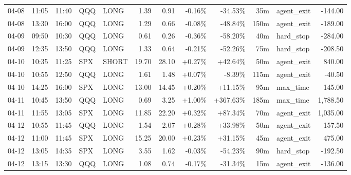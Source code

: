 \documentclass[11pt,a4paper,twoside]{article}
\begin{document}
\begin{center}
\begin{longtable}{>{\color{txtmain}}l l l l l r r r r r >{\color{txtmain}}l r}
04-08 & 11:05 & 11:40 & QQQ & LONG & 1.39 & 0.91 & \textcolor{lossred}{-0.16\%} & \textcolor{lossred}{-34.53\%} & 35m & agent\_exit & \textcolor{lossred}{-144.00} \\
04-08 & 13:30 & 16:00 & QQQ & LONG & 1.29 & 0.66 & \textcolor{lossred}{-0.08\%} & \textcolor{lossred}{-48.84\%} & 150m & agent\_exit & \textcolor{lossred}{-189.00} \\
04-09 & 09:50 & 10:30 & QQQ & LONG & 0.61 & 0.26 & \textcolor{lossred}{-0.36\%} & \textcolor{lossred}{-58.20\%} & 40m & hard\_stop & \textcolor{lossred}{-284.00} \\
04-09 & 12:35 & 13:50 & QQQ & LONG & 1.33 & 0.64 & \textcolor{lossred}{-0.21\%} & \textcolor{lossred}{-52.26\%} & 75m & hard\_stop & \textcolor{lossred}{-208.50} \\
04-10 & 10:35 & 11:25 & SPX & SHORT & 19.70 & 28.10 & \textcolor{wingreen}{+0.27\%} & \textcolor{wingreen}{+42.64\%} & 50m & agent\_exit & \textcolor{wingreen}{840.00} \\
04-10 & 10:55 & 12:50 & QQQ & LONG & 1.61 & 1.48 & \textcolor{wingreen}{+0.07\%} & \textcolor{lossred}{-8.39\%} & 115m & agent\_exit & \textcolor{lossred}{-40.50} \\
04-10 & 14:25 & 16:00 & SPX & LONG & 13.00 & 14.45 & \textcolor{wingreen}{+0.20\%} & \textcolor{wingreen}{+11.15\%} & 95m & max\_time & \textcolor{wingreen}{145.00} \\
04-11 & 10:45 & 13:50 & QQQ & LONG & 0.69 & 3.25 & \textcolor{wingreen}{+1.00\%} & \textcolor{wingreen}{+367.63\%} & 185m & max\_time & \textcolor{wingreen}{1,788.50} \\
04-11 & 11:55 & 13:05 & SPX & LONG & 11.85 & 22.20 & \textcolor{wingreen}{+0.32\%} & \textcolor{wingreen}{+87.34\%} & 70m & agent\_exit & \textcolor{wingreen}{1,035.00} \\
04-12 & 10:55 & 11:45 & QQQ & LONG & 1.54 & 2.07 & \textcolor{wingreen}{+0.28\%} & \textcolor{wingreen}{+33.98\%} & 50m & agent\_exit & \textcolor{wingreen}{157.50} \\
04-12 & 11:00 & 11:45 & SPX & LONG & 15.25 & 20.00 & \textcolor{wingreen}{+0.23\%} & \textcolor{wingreen}{+31.15\%} & 45m & agent\_exit & \textcolor{wingreen}{475.00} \\
04-12 & 13:05 & 14:35 & SPX & LONG & 3.55 & 1.62 & \textcolor{lossred}{-0.03\%} & \textcolor{lossred}{-54.23\%} & 90m & hard\_stop & \textcolor{lossred}{-192.50} \\
04-12 & 13:15 & 13:30 & QQQ & LONG & 1.08 & 0.74 & \textcolor{lossred}{-0.17\%} & \textcolor{lossred}{-31.34\%} & 15m & agent\_exit & \textcolor{lossred}{-136.00} \\

\end{longtable}
\end{center}
\end{document}
